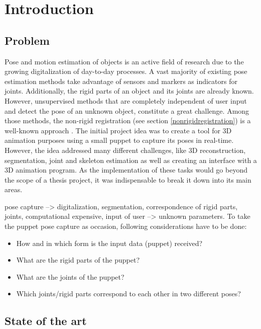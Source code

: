 \chapter{Introduction}
\label{cha:Introduction}



\section{Problem}

Pose and motion estimation of objects is an active field of research due to the growing digitalization of day-to-day processes. A vast majority of existing pose estimation methods take advantage of sensors and markers as indicators for joints. Additionally, the rigid parts of an object and its joints are already known. However, unsupervised methods that are completely independent of user input and detect the pose of an unknown object, constitute a great challenge. Among those methods, the non-rigid registration (see section \ref{nonrigidregistration}) is a well-known approach \cite{survey}. The initial project idea was to create a tool for 3D animation purposes using a small puppet to capture its poses in real-time. However, the idea addressed many different challenges, like 3D reconstruction, segmentation, joint and skeleton estimation as well as creating an interface with a 3D animation program. As the implementation of these tasks would go beyond the scope of a thesis project, it was indispensable to break it down into its main areas.  

pose capture --> digitalization, segmentation, correspondence of rigid parts, joints, computational expensive, input of user --> unknown parameters. To take the puppet pose capture as occasion, following considerations have to be done:
\begin{itemize}
	\item How and in which form is the input data (puppet) received?
	\item What are the rigid parts of the puppet?
	\item What are the joints of the puppet?
	\item Which joints/rigid parts correspond to each other in two different poses?	
\end{itemize}

\section{State of the art}

